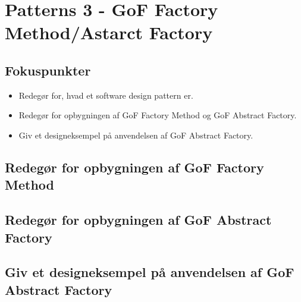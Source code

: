 \section{Patterns 3 - GoF Factory Method/Astarct Factory}

\subsection{Fokuspunkter}

\begin{itemize}
	\item Redegør for, hvad et software design pattern er.
	\item Redegør for opbygningen af GoF Factory Method og GoF Abstract Factory.
	\item Giv et designeksempel på anvendelsen af GoF Abstract Factory.
\end{itemize}



\subsection{Redegør for opbygningen af GoF Factory Method}
\subsection{Redegør for opbygningen af GoF Abstract Factory}
\subsection{Giv et designeksempel på anvendelsen af GoF Abstract Factory}
